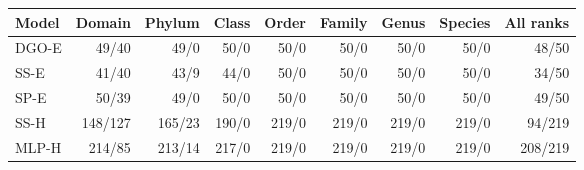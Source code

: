 \begin{center}\scriptsize\begin{tabular}{lrrrrrrrr}\toprule
Model & Domain & Phylum & Class & Order & Family & Genus & Species & All ranks \\
\midrule
DGO-E & 49/40 & 49/0 & 50/0 & 50/0 & 50/0 & 50/0 & 50/0 & 48/50 \\
SS-E & 41/40 & 43/9 & 44/0 & 50/0 & 50/0 & 50/0 & 50/0 & 34/50 \\
SP-E & 50/39 & 49/0 & 50/0 & 50/0 & 50/0 & 50/0 & 50/0 & 49/50 \\
SS-H & 148/127 & 165/23 & 190/0 & 219/0 & 219/0 & 219/0 & 219/0 & 94/219 \\
MLP-H & 214/85 & 213/14 & 217/0 & 219/0 & 219/0 & 219/0 & 219/0 & 208/219 \\
\bottomrule\end{tabular}\end{center}
